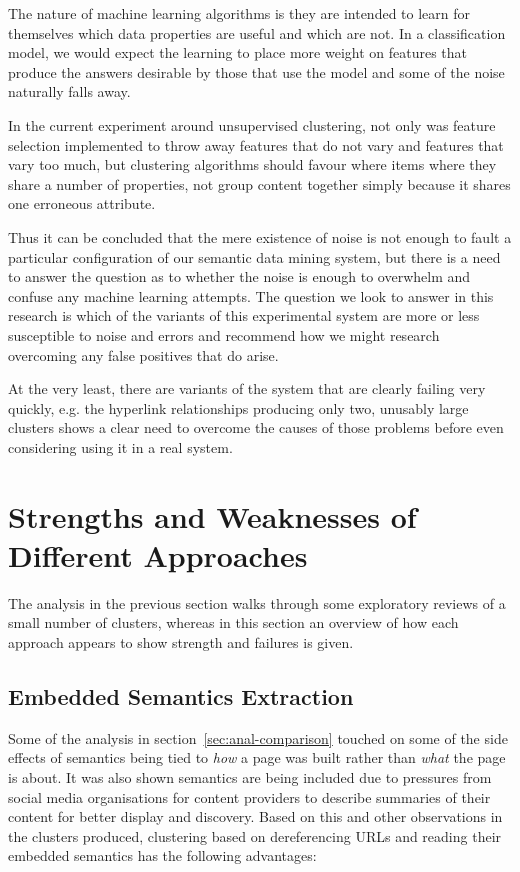 The nature of machine learning algorithms is they are intended to
learn for themselves which data properties are useful and which are
not. In a classification model, we would expect the learning to
place more weight on features that produce the answers desirable
by those that use the model and some of the noise naturally falls
away.

In the current experiment around unsupervised clustering, not only
was feature selection implemented to throw away features that do not
vary and features that vary too much, but clustering algorithms
should favour where items where they share a number of properties, not
group content together simply because it shares one erroneous
attribute.

Thus it can be concluded that the mere existence of noise is not
enough to fault a particular configuration of our semantic data mining
system, but there is a need to answer the question as to whether the
noise is enough to overwhelm and confuse any machine learning
attempts. The question we look to answer in this research is which
of the variants of this experimental system are more or less
susceptible to noise and errors and recommend how we might research
overcoming any false positives that do arise.

At the very least, there are variants of the system that are clearly
failing very quickly, e.g. the hyperlink relationships producing only
two, unusably large clusters shows a clear need to overcome the causes
of those problems before even considering using it in a real system.

\section{Strengths and Weaknesses of Different Approaches}

The analysis in the previous section walks through some exploratory
reviews of a small number of clusters, whereas in this section an
overview of how each approach appears to show strength and failures
is given.

\subsection{Embedded Semantics Extraction}
\label{sec:anal-deref}

Some of the analysis in section~\ref{sec:anal-comparison} touched on
some of the side effects of semantics being tied to \emph{how} a page
was built rather than \emph{what} the page is about. It was also
shown semantics are being included due to  pressures from social media
organisations for content
providers to describe summaries of their content for better display
and discovery. Based on this and other observations in the clusters
produced, clustering based on dereferencing URLs and reading their
embedded semantics has the following advantages:

